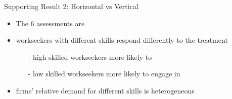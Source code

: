 \begin{frame}{Supporting Result 2: Horizontal vs Vertical}
    \begin{itemize}
        \item<+-> The 6 assessments are 
        \item<+-> workseekers with different skills respond differently to the treatment
        \begin{itemize}
            \item[-] high skilled workseekers more likely to 
            \item[-] low skilled workseekers more likely to engage in  
        \end{itemize} 
        \item<+-> firms' relative demand for different skills is heterogeneous 
    \end{itemize}



\end{frame}
